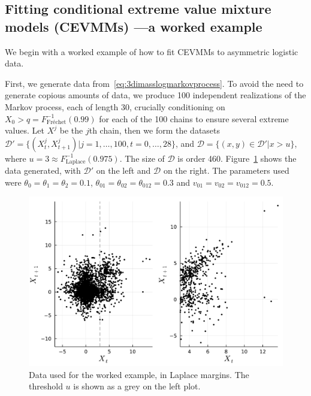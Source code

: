 \documentclass[11pt,twoside,openany]{book}
\newcommand{\prob}{\mathbb{P}}
\newcommand{\D}{\mathcal{D}}
\numberwithin{Theorem}{chapter}
\numberwithin{Definition}{chapter}
\numberwithin{Lemma}{chapter}
\numberwithin{Algorithm}{chapter}
\numberwithin{equation}{chapter}
\begin{document}
\clearpage
\subsection{Fitting conditional extreme value mixture models (CEVMMs) ---a worked example}\label{sec:worked_example}

We begin with a worked example of how to fit CEVMMs
to asymmetric logistic data.


First, we generate data from~\eqref{eq:3dimasslogmarkovprocess}. To avoid
the need to generate copious amounts of data, we produce 100 independent
realizations of the Markov process, each of length 30, crucially conditioning on $X_{0} > q
= F_{\text{Fréchet}}^{-1}(0.99)$ for each of the 100 chains to ensure
several extreme values. Let $X^j$ be the $j$th chain, then we form the datasets
$\D' = \{(X^j_{t},X_{t+1}^j) | j=1,\ldots,100, t=0,\ldots,28\}$,
and $\D = \{(x,y)\in \D' | x > u\}$, where $u=3\approx F_{\text{Laplace}}^{-1}(0.975)$.
The size of $\D$ is order 460. Figure~\ref{fig:worked_example_data} shows the data generated, with $\D'$ on the
left and $\D$ on the right. The parameters used were
$\theta_0=\theta_1=\theta_2=0.1$, $\theta_{01}=\theta_{02}=\theta_{012}=0.3$
and $v_{01}=v_{02}=v_{012}=0.5$.
\begin{figure}[htp]
  \centering
  \includegraphics[scale=0.7]{../ht-em/figures/worked_example_data.pdf}
  \caption{Data used for the worked example, in Laplace margins. The threshold
    $u$ is shown as a grey  on the left plot.
}\label{fig:worked_example_data}
\end{figure}
\end{document}
